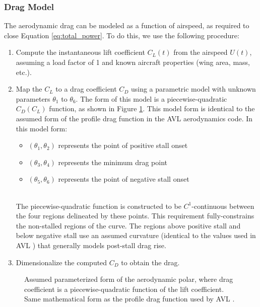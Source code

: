 \subsubsection{Drag Model}
\label{subsubsec:drag_model}
The aerodynamic drag can be modeled as a function of airspeed, as required to close Equation \ref{eq:total_power}. To do this, we use the following procedure:

\begin{enumerate}
    \item Compute the instantaneous lift coefficient $C_L(t)$ from the airspeed $U(t)$, assuming a load factor of 1 and known aircraft properties (wing area, mass, etc.).
    \item Map the $C_L$ to a drag coefficient $C_D$ using a parametric model with unknown parameters $\theta_1$ to $\theta_6$. The form of this model is a piecewise-quadratic $C_D(C_L)$ function, as shown in Figure \ref{fig:aero_polar_form}. This model form is identical to the assumed form of the profile drag function in the AVL \cite{drela_athena_2004} aerodynamics code. In this model form:\\
    \begin{itemize}
        \item $(\theta_1, \theta_2)$ represents the point of positive stall onset
        \item $(\theta_3, \theta_4)$ represents the minimum drag point
        \item $(\theta_5, \theta_6)$ represents the point of negative stall onset
    \end{itemize}
    \ \\The piecewise-quadratic function is constructed to be $C^1$-continuous between the four regions delineated by these points. This requirement fully-constrains the non-stalled regions of the curve. The regions above positive stall and below negative stall use an assumed curvature (identical to the values used in AVL \cite{drela_athena_2004}) that generally models post-stall drag rise.

    \item Dimensionalize the computed $C_D$ to obtain the drag.
\end{enumerate}

\begin{figure}[h]
    \centering
    
    \caption{Assumed parameterized form of the aerodynamic polar, where drag coefficient is a piecewise-quadratic function of the lift coefficient. Same mathematical form as the profile drag function used by AVL \cite{drela_athena_2004}.}
    \label{fig:aero_polar_form}
\end{figure}


